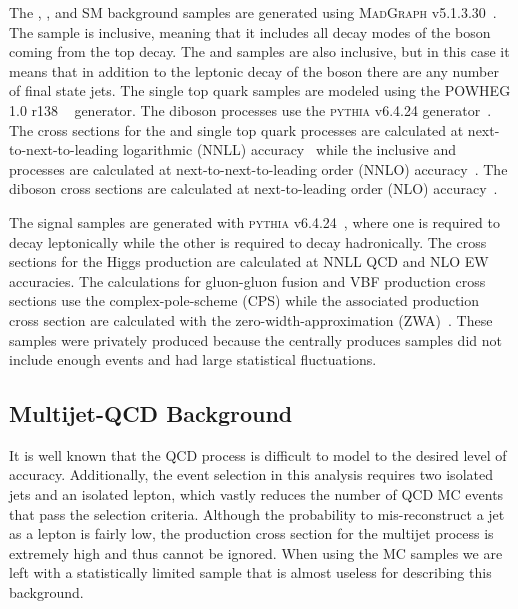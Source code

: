The \ttbar, \Wjets, and \Zjets SM background samples are generated using \textsc{Mad}\textsc{Graph} v5.1.3.30~\cite{Alwall:2014hca}.
The \ttbar sample is inclusive, meaning that it includes all decay modes of the \W boson coming from the top decay.
The \Wjets and \Zjets samples are also inclusive, but in this case it means that in addition to the leptonic decay of the boson there are any number of final state jets.
The single top quark samples are modeled using the \textsc{POWHEG} 1.0 r138 ~\cite{POWHEG2,POWHEG:singlet,POWHEG:singletW} generator.
The diboson processes use the \textsc{pythia} v6.4.24 generator~\cite{1126-6708-2006-05-026}.
The cross sections for the \ttbar and single top quark processes are calculated at next-to-next-to-leading logarithmic (NNLL) accuracy~\cite{TOPCrossSec} while the inclusive \Wjets and \Zjets processes are calculated at next-to-next-to-leading order (NNLO) accuracy~\cite{FEWZ}.
The diboson cross sections are calculated at next-to-leading order (NLO) accuracy~\cite{MCFM}.

The \HWW signal samples are generated with \textsc{pythia} v6.4.24~\cite{1126-6708-2006-05-026}, where one \W is required to decay leptonically while the other is required to decay hadronically.
The cross sections for the Higgs production are calculated at NNLL QCD and NLO EW accuracies.
The calculations for gluon-gluon fusion and VBF production cross sections use the complex-pole-scheme (CPS) while the associated production cross section are calculated with the zero-width-approximation (ZWA)~\cite{Heinemeyer:2013tqa}.
These samples were privately produced because the centrally produces samples did not include enough events and had large statistical fluctuations.

\subsection{Multijet-QCD Background}
\label{sec:QCD_data-driven_sample}

It is well known that the QCD process is difficult to model to the desired level of accuracy.
Additionally, the event selection in this analysis requires two isolated jets and an isolated lepton, which vastly reduces the number of QCD MC events that pass the selection criteria.
Although the probability to mis-reconstruct a jet as a lepton is fairly low, the production cross section for the multijet process is extremely high and thus cannot be ignored.
When using the MC samples we are left with a statistically limited sample that is almost useless for describing this background.

